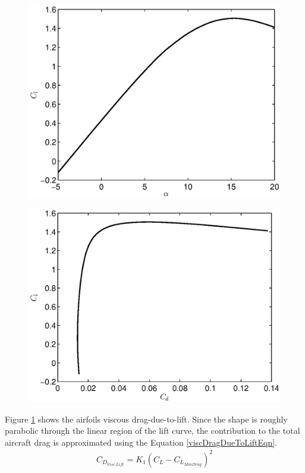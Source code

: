 \begin{figure}[h!]
\centering
\begin{minipage}{.5\textwidth}
  \centering
  \includegraphics[width=.9\linewidth]{figures/naca4412liftcurve.eps}
  \label{naca4412liftcurve}
\end{minipage}%
\begin{minipage}{.5\textwidth}
  \centering
  \includegraphics[width=.9\linewidth]{figures/naca4412dragpolar.eps}
  \label{naca4412dragpolar}
\end{minipage}
\end{figure}

Figure \ref{naca4412dragpolar} shows the airfoils viscous drag-due-to-lift. Since the shape is roughly parabolic through the linear region of the lift curve, the contribution to the total aircraft drag is approximated using the Equation \ref{viscDragDueToLiftEqn}\cite{nicolaiWhitePaper}.
\begin{align}
\label{viscDragDueToLiftEqn}
C_{D_{Visc. Lift}} = K_1 (C_L - C_{L_{Min Drag}})^2
\end{align}

